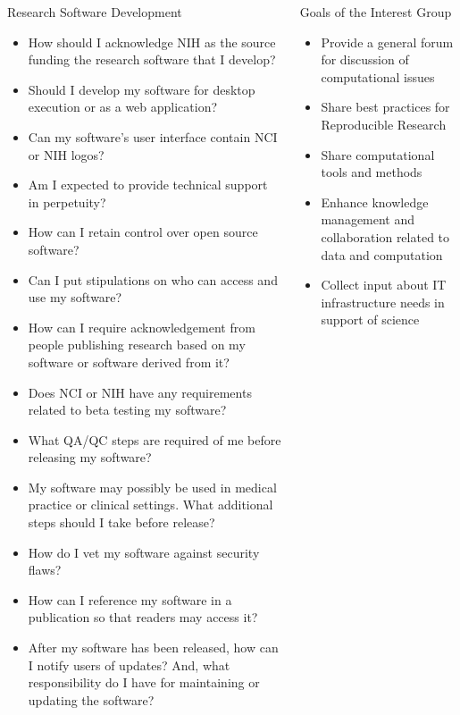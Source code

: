 \documentclass[final]{beamer}
\begin{document}
\begin{frame}[t]
\begin{columns}[t]
\begin{column}{0.3\linewidth}
\begin{block}{Research Software Development}
{\begin{itemize}
\item{How should I acknowledge NIH as the source funding the research software that I develop?}
\item{Should I develop my software for desktop execution or as a web application?}
\item{Can my software's user interface contain NCI or NIH logos?}
\item{Am I expected to provide technical support in perpetuity?}
\item{How can I retain control over open source software?}
\item{Can I put stipulations on who can access and use my software?}
\item{How can I require acknowledgement from people publishing research based on my software or software derived from it?}
\item{Does NCI or NIH have any requirements related to beta testing my software?}
\item{What QA/QC steps are required of me before releasing my software? }
\item{My software may possibly be used in medical practice or clinical settings.  What additional steps should I take before release?}
\item{How do I vet my software against security flaws?}
\item{How can I reference my software in a publication so that readers may access it?}
\item{After my software has been released, how can I notify users of updates?  And, what responsibility do I have for maintaining or updating the software?}
\end{itemize}
}
\end{block}
\end{column}
    \begin{column}{0.3\linewidth}
      \begin{block}{Goals of the Interest Group}
        \begin{itemize}
        \item{Provide a general forum for discussion of computational issues}
        \item{Share best practices for Reproducible Research}
        \item{Share computational tools and methods}
        \item{Enhance knowledge management and collaboration related to data and computation}
        \item{Collect input about IT infrastructure needs in support of science}

\end{itemize}
\end{block}
\end{column}
\end{columns}
\end{frame}
\end{document}
